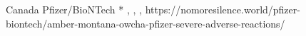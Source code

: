           {
            Canada
          }
          {
          }
          {
            Pfizer/BioNTech
          }
          {
            *
          }
          {
            ,
            ,
            ,
          }
          {
            https://nomoresilence.world/pfizer-biontech/amber-montana-owcha-pfizer-severe-adverse-reactions/
          }

